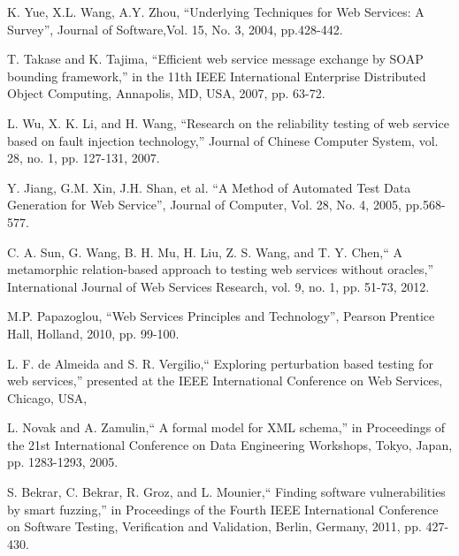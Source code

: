 \documentclass{bredelebeamer}
\begin{document}
\begin{frame}[allowframebreaks]
\begin{thebibliography}{9}
	
	K. Yue, X.L. Wang, A.Y. Zhou, ``Underlying Techniques for Web
	Services: A Survey'', Journal of Software,Vol. 15, No. 3, 2004,
	pp.428-442.
	
	T. Takase and K. Tajima, ``Efficient web service message
	exchange by SOAP bounding framework,'' in the 11th IEEE
	International Enterprise Distributed Object Computing,
	Annapolis, MD, USA, 2007, pp. 63-72.
	
	
	L. Wu, X. K. Li, and H. Wang, ``Research on the reliability
	testing of web service based on fault injection technology,''
	Journal of Chinese Computer System, vol. 28, no. 1, pp.
	127-131, 2007.
	
	Y. Jiang, G.M. Xin, J.H. Shan, et al. ``A Method of Automated Test
	Data Generation for Web Service'', Journal of Computer, Vol. 28, No.
	4, 2005, pp.568-577.
	
	C. A. Sun, G. Wang, B. H. Mu, H. Liu, Z. S. Wang, and T.
	Y. Chen,`` A metamorphic relation-based approach to testing
	web services without oracles,'' International Journal of Web
	Services Research, vol. 9, no. 1, pp. 51-73, 2012.
	
	M.P. Papazoglou, ``Web Services Principles and Technology'',
	Pearson Prentice Hall, Holland, 2010, pp. 99-100.
	
	L. F. de Almeida and S. R. Vergilio,`` Exploring perturbation
	based testing for web services,'' presented at the IEEE
	International Conference on Web Services, Chicago, USA,
	
	L. Novak and A. Zamulin,`` A formal model for
	XML schema,'' in Proceedings of the 21st International
	Conference on Data Engineering Workshops, Tokyo,
	Japan, pp. 1283-1293, 2005.
	
	S. Bekrar, C. Bekrar, R. Groz, and L. Mounier,`` Finding
	software vulnerabilities by smart fuzzing,'' in Proceedings
	of the Fourth IEEE International Conference on Software
	Testing, Verification and Validation, Berlin, Germany,
	2011, pp. 427-430.
		

\end{thebibliography}
\end{frame}
\end{document}
